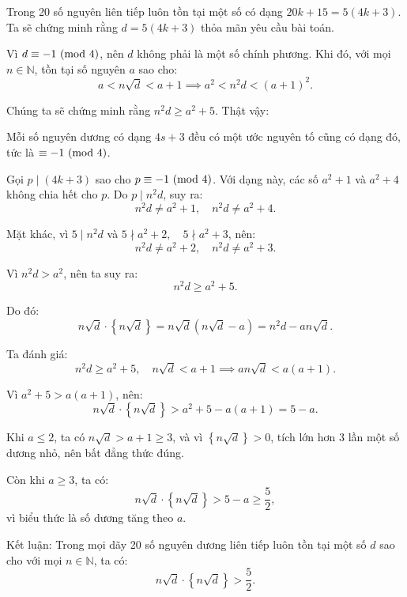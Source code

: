 \documentclass[../03-arithmetic-functions.tex]{subfiles}
\begin{document}
\bigbreak
\begin{soln}\footnotemark
	Trong 20 số nguyên liên tiếp luôn tồn tại một số có dạng \( 20k + 15 = 5(4k + 3) \).
	Ta sẽ chứng minh rằng \( d = 5(4k + 3) \) thỏa mãn yêu cầu bài toán.

	Vì \( d \equiv -1 \ (\mathrm{mod}\ 4) \), nên \( d \) không phải là một số chính phương.
	Khi đó, với mọi \( n \in \mathbb{N} \), tồn tại số nguyên \( a \) sao cho:
	\[
		a < n\sqrt{d} < a + 1 \implies a^2 < n^2 d < (a + 1)^2.
	\]
	
	Chúng ta sẽ chứng minh rằng \( n^2 d \geq a^2 + 5 \). Thật vậy:

	\begin{theorem*}
		Mỗi số nguyên dương có dạng \(4s + 3\) đều có một ước nguyên tố cũng có dạng đó, tức là \(\equiv -1 \ (\mathrm{mod}\ 4)\).
	\end{theorem*}

	Gọi \( p \mid (4k + 3) \) sao cho \( p \equiv -1 \ (\mathrm{mod}\ 4) \).
	Với dạng này, các số \( a^2 + 1 \) và \( a^2 + 4 \) không chia hết cho \( p \).
	Do \( p \mid n^2 d \), suy ra:
	\[
		n^2 d \ne a^2 + 1, \quad n^2 d \ne a^2 + 4.
	\]
	
	Mặt khác, vì \( 5 \mid n^2 d \) và \( 5 \nmid a^2 + 2, \quad 5 \nmid a^2 + 3 \), nên:
	\[
		n^2 d \ne a^2 + 2, \quad n^2 d \ne a^2 + 3.
	\]
	
	Vì \( n^2 d > a^2 \), nên ta suy ra:
	\[
		n^2 d \geq a^2 + 5.
	\]
	
	Do đó:
	\[
		n\sqrt{d} \cdot \left\{n\sqrt{d}\right\}
		= n\sqrt{d}(n\sqrt{d} - a)
		= n^2 d - a n\sqrt{d}.
	\]
	
	Ta đánh giá:
	\[
		n^2 d \geq a^2 + 5, 
		\quad n\sqrt{d} < a + 1 
		\implies a n\sqrt{d} < a(a + 1).
	\]
	
	Vì \( a^2 + 5 > a(a + 1) \), nên:
	\[
		n\sqrt{d} \cdot \left\{n\sqrt{d}\right\} > a^2 + 5 - a(a + 1) = 5 - a.
	\]
	
	Khi \( a \leq 2 \), ta có \( n\sqrt{d} > a + 1 \geq 3 \), và vì \( \left\{ n\sqrt{d} \right\} > 0 \),
	tích lớn hơn 3 lần một số dương nhỏ, nên bất đẳng thức đúng.
	
	Còn khi \( a \geq 3 \), ta có:
	\[
		n\sqrt{d} \cdot \left\{n\sqrt{d}\right\} > 5 - a \geq \frac{5}{2},
	\]
	vì biểu thức là số dương tăng theo \( a \).
	
	Kết luận: Trong mọi dãy 20 số nguyên dương liên tiếp luôn tồn tại một số \( d \) sao cho với mọi \( n \in \mathbb{N} \), ta có:
	\[
		n\sqrt{d} \cdot \left\{n\sqrt{d}\right\} > \frac{5}{2}.
	\]	
\end{soln}

\end{document}
